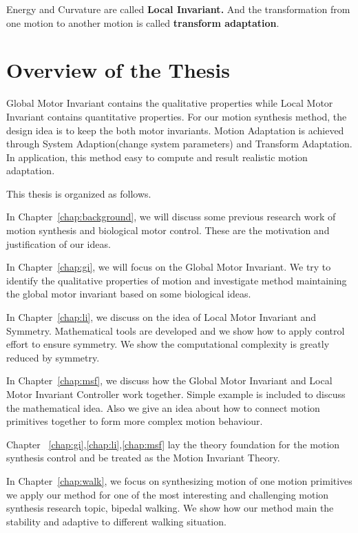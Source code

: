 Energy and Curvature are called \textbf{Local Invariant.} 
And the transformation from one motion to another motion is called \textbf{transform adaptation}.



\section{Overview of the Thesis}
Global Motor Invariant contains the qualitative properties while Local Motor Invariant contains quantitative properties. 
For our motion synthesis method, the design idea is to keep the both motor invariants. 
Motion Adaptation is achieved through System Adaption(change system parameters) and Transform Adaptation.
In application, this method easy to compute and result realistic motion adaptation.



This thesis is organized as follows.
 
In Chapter~\ref{chap:background}, we will discuss some previous research work of motion synthesis  and biological motor control. 
These are the motivation and justification of our ideas.
 
In Chapter~\ref{chap:gi}, we will focus on the Global Motor Invariant. 
We try to identify the qualitative properties of motion and investigate method maintaining the global motor invariant based on some biological ideas.

In Chapter~\ref{chap:li}, we discuss on the idea of Local Motor Invariant and Symmetry.
Mathematical tools are developed and we show how to apply control effort to ensure symmetry. 
We show the computational complexity is greatly reduced by symmetry.

In Chapter~\ref{chap:msf}, we discuss how the Global Motor Invariant and Local Motor Invariant Controller work together. 
Simple example is included to discuss the mathematical idea. 
Also we give an idea about how to connect motion primitives together to form more complex motion behaviour.

Chapter ~\ref{chap:gi},\ref{chap:li},\ref{chap:msf} lay the theory foundation for the motion synthesis control and be treated as the Motion Invariant Theory.


In Chapter~\ref{chap:walk}, we focus on synthesizing motion of one motion primitives
 we apply our method for one of the most interesting and challenging motion synthesis research topic, bipedal walking. We show how our method main the stability and adaptive to different walking situation.


